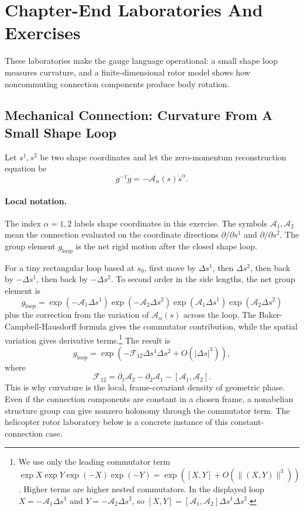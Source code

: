 \section{Chapter-End Laboratories And Exercises}
\label{sec:deforming-body-chapter-end-labs}

These laboratories make the gauge language operational: a small shape loop
measures curvature, and a finite-dimensional rotor model shows how
noncommuting connection components produce body rotation.

\subsection{Mechanical Connection: Curvature From A Small Shape Loop}
\label{sec:detailed-connection-curvature}

Let \(s^1,s^2\) be two shape coordinates and let the zero-momentum
reconstruction equation be
\[
  g^{-1}\dot g
  =
  -\mathcal A_\alpha(s)\dot s^\alpha.
\]

\paragraph{Local notation.}
The index \(\alpha=1,2\) labels shape coordinates in this exercise.  The
symbols \(\mathcal A_1,\mathcal A_2\) mean the connection evaluated on the
coordinate directions \(\partial/\partial s^1\) and \(\partial/\partial s^2\).
The group element \(g_{\mathrm{loop}}\) is the net rigid motion after the
closed shape loop.

For a tiny rectangular loop based at \(s_0\), first move by
\(\Delta s^1\), then \(\Delta s^2\), then back by \(-\Delta s^1\), then back
by \(-\Delta s^2\). To second order in the side lengths, the net group element
is
\[
  g_{\mathrm{loop}}
  =
  \exp(-\mathcal A_1\Delta s^1)
  \exp(-\mathcal A_2\Delta s^2)
  \exp(\mathcal A_1\Delta s^1)
  \exp(\mathcal A_2\Delta s^2)
\]
plus the correction from the variation of \(\mathcal A_\alpha(s)\) across the
loop. The Baker-Campbell-Hausdorff formula gives the commutator contribution,
while the spatial variation gives derivative terms.\footnote{We use only the
leading commutator term
\(\exp X\exp Y\exp(-X)\exp(-Y)=\exp([X,Y]+O(\|(X,Y)\|^3))\). Higher terms are
higher nested commutators. In the displayed loop
\(X=-\mathcal A_1\Delta s^1\) and
\(Y=-\mathcal A_2\Delta s^2\), so \([X,Y]=[\mathcal A_1,\mathcal A_2]\Delta
s^1\Delta s^2\).} The result is
\[
  g_{\mathrm{loop}}
  =
  \exp\left(
    -\mathcal F_{12}\Delta s^1\Delta s^2
    +
    O(|\Delta s|^3)
  \right),
\]
where
\[
  \boxed{
  \mathcal F_{12}
  =
  \partial_1\mathcal A_2-\partial_2\mathcal A_1
  -
  [\mathcal A_1,\mathcal A_2].
  }
\]
This is why curvature is the local, frame-covariant density of geometric phase.
Even if the connection components are constant in a chosen frame, a nonabelian
structure group can give nonzero holonomy through the commutator term. The
helicopter rotor laboratory below is a concrete instance of this
constant-connection case.

